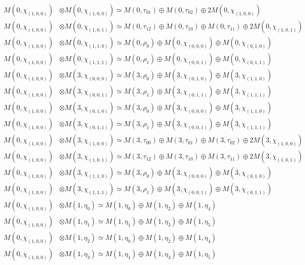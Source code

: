 \begin{align*}
M(0,\chi_{(1,0,0)}) &\otimes M(0,\chi_{(1,0,0)}) \simeq M(0,\tau_{01}) \oplus M(0,\tau_{02}) \oplus 2 M(0,\chi_{(1,0,0)}) \\
M(0,\chi_{(1,0,0)}) &\otimes M(0,\chi_{(1,0,1)}) \simeq M(0,\tau_{12}) \oplus M(0,\tau_{10}) \oplus M(0,\tau_{11}) \oplus 2 M(0,\chi_{(1,0,1)}) \\
M(0,\chi_{(1,0,0)}) &\otimes M(0,\chi_{(1,1,0)}) \simeq M(0,\rho_{0}) \oplus M(0,\chi_{(0,0,0)}) \oplus M(0,\chi_{(0,1,0)}) \\
M(0,\chi_{(1,0,0)}) &\otimes M(0,\chi_{(1,1,1)}) \simeq M(0,\rho_{1}) \oplus M(0,\chi_{(0,0,1)}) \oplus M(0,\chi_{(0,1,1)}) \\
M(0,\chi_{(1,0,0)}) &\otimes M(3,\chi_{(0,0,0)}) \simeq M(3,\rho_{0}) \oplus M(3,\chi_{(0,1,0)}) \oplus M(3,\chi_{(1,1,0)}) \\
M(0,\chi_{(1,0,0)}) &\otimes M(3,\chi_{(0,0,1)}) \simeq M(3,\rho_{1}) \oplus M(3,\chi_{(0,1,1)}) \oplus M(3,\chi_{(1,1,1)}) \\
M(0,\chi_{(1,0,0)}) &\otimes M(3,\chi_{(0,1,0)}) \simeq M(3,\rho_{0}) \oplus M(3,\chi_{(0,0,0)}) \oplus M(3,\chi_{(1,1,0)}) \\
M(0,\chi_{(1,0,0)}) &\otimes M(3,\chi_{(0,1,1)}) \simeq M(3,\rho_{1}) \oplus M(3,\chi_{(0,0,1)}) \oplus M(3,\chi_{(1,1,1)}) \\
M(0,\chi_{(1,0,0)}) &\otimes M(3,\chi_{(1,0,0)}) \simeq M(3,\tau_{00}) \oplus M(3,\tau_{01}) \oplus M(3,\tau_{02}) \oplus 2 M(3,\chi_{(1,0,0)}) \\
M(0,\chi_{(1,0,0)}) &\otimes M(3,\chi_{(1,0,1)}) \simeq M(3,\tau_{12}) \oplus M(3,\tau_{10}) \oplus M(3,\tau_{11}) \oplus 2 M(3,\chi_{(1,0,1)}) \\
M(0,\chi_{(1,0,0)}) &\otimes M(3,\chi_{(1,1,0)}) \simeq M(3,\rho_{0}) \oplus M(3,\chi_{(0,0,0)}) \oplus M(3,\chi_{(0,1,0)}) \\
M(0,\chi_{(1,0,0)}) &\otimes M(3,\chi_{(1,1,1)}) \simeq M(3,\rho_{1}) \oplus M(3,\chi_{(0,0,1)}) \oplus M(3,\chi_{(0,1,1)}) \\
M(0,\chi_{(1,0,0)}) &\otimes M(1,\eta_{0}) \simeq M(1,\eta_{0}) \oplus M(1,\eta_{2}) \oplus M(1,\eta_{4}) \\
M(0,\chi_{(1,0,0)}) &\otimes M(1,\eta_{1}) \simeq M(1,\eta_{1}) \oplus M(1,\eta_{3}) \oplus M(1,\eta_{5}) \\
M(0,\chi_{(1,0,0)}) &\otimes M(1,\eta_{2}) \simeq M(1,\eta_{0}) \oplus M(1,\eta_{2}) \oplus M(1,\eta_{4}) \\
M(0,\chi_{(1,0,0)}) &\otimes M(1,\eta_{3}) \simeq M(1,\eta_{1}) \oplus M(1,\eta_{3}) \oplus M(1,\eta_{5}) \\

\end{align*}
